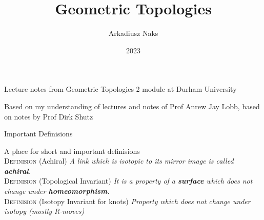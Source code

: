 \documentclass[12pt, letterpaper]{article}
\title{Geometric Topologies}
\author{Arkadiusz Naks}
\date{2023}
\begin{document}
\begin{titlepage}
  \begin{center}
    \makeatletter
    \vspace*{1cm}
    \Huge
    \textbf{\@title}

    \vspace{0.5cm}
    \Large
    Lecture notes from Geometric Topologies 2 module at Durham University

    \vspace{1.5cm}

    \textbf{\@author}

    \vfill

    \vspace{0.8cm}

    \small
    Based on my understanding of lectures and notes of Prof Anrew Jay Lobb,
    based on notes by Prof Dirk Shutz\\
    
    \@date{}
  \end{center}
\end{titlepage}

\tableofcontents
\newpage

\begin{section}{Important Definisions}

  A place for short and important definisions \\
  \textsc{Definision} (Achiral) \textit{A link which is isotopic to its
    mirror image is called \textbf{achiral}.} \\
  \textsc{Definision} (Topological Invariant) \textit{It is a property of
    a \textbf{surface} which does not change under \textbf{homeomorphism}.} \\
  \textsc{Definision} (Isotopy Invariant for knots) \textit{Property which does
    not change under isotopy (mostly R-moves)}

\end{section}
\end{document}

